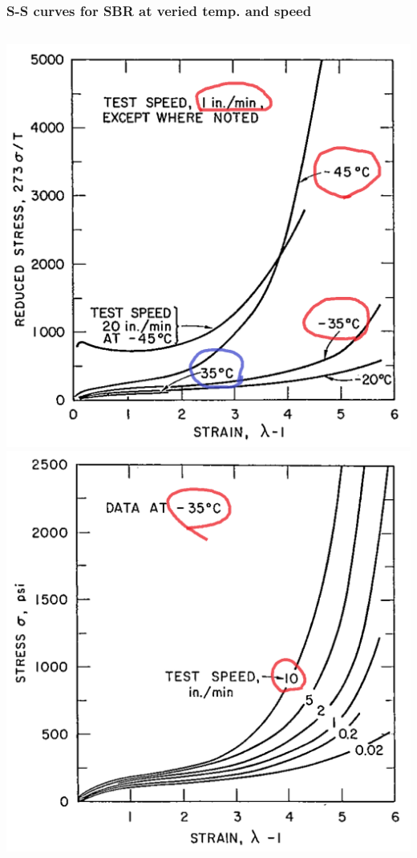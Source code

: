 \documentclass[12pt, dvipdfmx]{beamer}
\begin{document}
\begin{frame}
	\frametitle{S-S curves for SBR at veried temp. and speed}

			\begin{columns}[T, onlytextwidth]
				\centering
				\includegraphics[width=\textwidth]{SBR_lowTemp.png}
				\centering
				\includegraphics[width=\textwidth]{SBR_lowTemp_2.png}
			\end{columns}


\end{frame}
\end{document}
